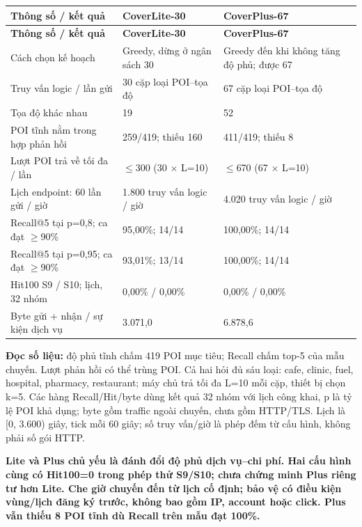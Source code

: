 \documentclass[10pt,a4paper]{article}
\newcommand{\key}[1]{\par\smallskip\noindent\colorbox{pale}{\parbox{\dimexpr\linewidth-2\fboxsep}{\textbf{#1}}}\par\smallskip}
\begin{document}
\begingroup\small
\begin{longtable}{@{}P{5.612cm}P{5.513cm}P{5.513cm}@{}}
\toprule
\textbf{Thông số / kết quả} & \textbf{CoverLite-30} & \textbf{CoverPlus-67}\\\midrule
\endfirsthead
\toprule
\textbf{Thông số / kết quả} & \textbf{CoverLite-30} & \textbf{CoverPlus-67}\\\midrule
\endhead
\bottomrule\endfoot
Cách chọn kế hoạch & Greedy, dừng ở ngân sách 30 & Greedy đến khi không tăng độ phủ; được 67\\
\addlinespace[3pt]
Truy vấn logic / lần gửi & 30 cặp loại POI–tọa độ & 67 cặp loại POI–tọa độ\\
\addlinespace[3pt]
Tọa độ khác nhau & 19 & 52\\
\addlinespace[3pt]
POI tĩnh nằm trong hợp phản hồi & 259/419; thiếu 160 & 411/419; thiếu 8\\
\addlinespace[3pt]
Lượt POI trả về tối đa / lần & $\le$300 (30 $\times$ L=10) & $\le$670 (67 $\times$ L=10)\\
\addlinespace[3pt]
Lịch endpoint: 60 lần gửi / giờ & 1.800 truy vấn logic / giờ & 4.020 truy vấn logic / giờ\\
\addlinespace[3pt]
Recall@5 tại p=0,8; ca đạt $\ge$90\% & 95,00\%; 14/14 & 100,00\%; 14/14\\
\addlinespace[3pt]
Recall@5 tại p=0,95; ca đạt $\ge$90\% & 93,01\%; 13/14 & 100,00\%; 14/14\\
\addlinespace[3pt]
Hit100 S9 / S10; lịch, 32 nhóm & 0,00\% / 0,00\% & 0,00\% / 0,00\%\\
\addlinespace[3pt]
Byte gửi + nhận / sự kiện dịch vụ & 3.071,0 & 6.878,6\\
\end{longtable}
\endgroup
\textbf{Đọc số liệu:} độ phủ tĩnh chấm 419 POI mục tiêu; Recall chấm top-5 của mẫu chuyến. Lượt phản hồi có thể trùng POI. Cả hai hỏi đủ sáu loại: cafe, clinic, fuel, hospital, pharmacy, restaurant; máy chủ trả tối đa L=10 mỗi cặp, thiết bị chọn k=5. Các hàng Recall/Hit/byte dùng kết quả 32 nhóm với lịch công khai, p là tỷ lệ POI khả dụng; byte gồm traffic ngoài chuyến, chưa gồm HTTP/TLS. Lịch là [0, 3.600) giây, tick mỗi 60 giây; số truy vấn/giờ là phép đếm từ cấu hình, không phải số gói HTTP.

\key{Lite và Plus chủ yếu là đánh đổi độ phủ dịch vụ–chi phí. Hai cấu hình cùng có Hit100=0 trong phép thử S9/S10; chưa chứng minh Plus riêng tư hơn Lite. Che giờ chuyến đến từ lịch cố định; bảo vệ có điều kiện vùng/lịch đăng ký trước, không bao gồm IP, account hoặc click. Plus vẫn thiếu 8 POI tĩnh dù Recall trên mẫu đạt 100\%.}
\end{document}
